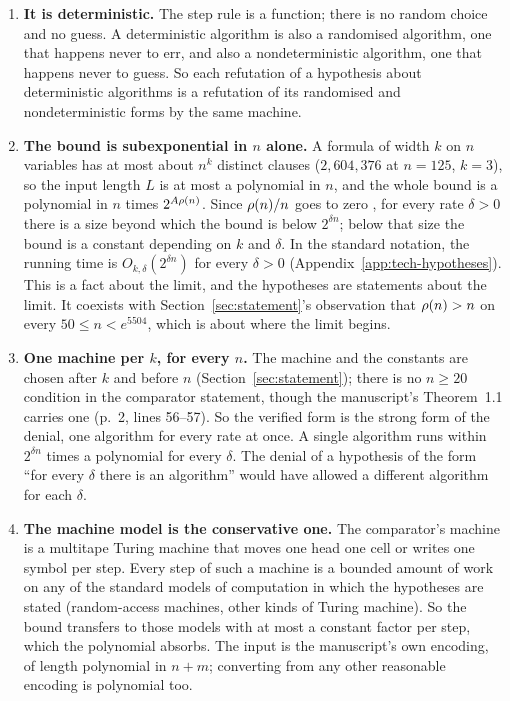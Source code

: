 \begin{enumerate}
\item \textbf{It is deterministic.} The step rule is a function; there
  is no random choice and no guess. A deterministic algorithm is also a
  randomised algorithm, one that happens never to err, and also a
  nondeterministic algorithm, one that happens never to guess. So each
  refutation of a hypothesis about deterministic algorithms is a
  refutation of its randomised and nondeterministic forms by the same
  machine.
\item \textbf{The bound is subexponential in $n$ alone.} A formula of
  width $k$ on $n$ variables has at most about $n^k$ distinct clauses
  ($2{,}604{,}376$ at $n = 125$, $k = 3$), so the input length $L$ is at
  most a polynomial in $n$, and the whole bound is a polynomial in $n$
  times $2^{A\rho(n)}$. Since $\rho(n)/n$ goes to zero
  , for every rate $\delta > 0$ there is a size
  beyond which the bound is below $2^{\delta n}$; below that size the
  bound is a constant depending on $k$ and $\delta$. In the standard
  notation, the running time is $O_{k,\delta}(2^{\delta n})$ for every
  $\delta > 0$ (Appendix~\ref{app:tech-hypotheses}). This is a fact
  about the limit, and the hypotheses are statements about the limit.
  It coexists with Section~\ref{sec:statement}'s observation that
  $\rho(n) > n$ on every $50 \le n < e^{5504}$, which is about where the
  limit begins.
\item \textbf{One machine per $k$, for every $n$.} The machine and the
  constants are chosen after $k$ and before $n$
  (Section~\ref{sec:statement}); there is no $n \ge 20$ condition in the
  comparator statement, though the manuscript's Theorem~1.1 carries one
  (p.~2, lines 56--57). So the verified form is the strong form of the denial, one algorithm for every rate at once. A single algorithm runs within $2^{\delta n}$ times a
  polynomial for every $\delta$. The denial of a
  hypothesis of the form ``for every $\delta$ there is an algorithm''
  would have allowed a different algorithm for each $\delta$.
\item \textbf{The machine model is the conservative one.} The
  comparator's machine is a multitape Turing machine that moves one head
  one cell or writes one symbol per step. Every step of such a machine is a bounded amount of work on any of the standard models of computation in which the hypotheses are stated (random-access machines, other kinds of Turing machine). So the bound transfers to those models with at
  most a constant factor per step, which the polynomial absorbs. The
  input is the manuscript's own encoding, of length polynomial in
  $n + m$; converting from any other reasonable encoding is polynomial
  too.
\end{enumerate}

